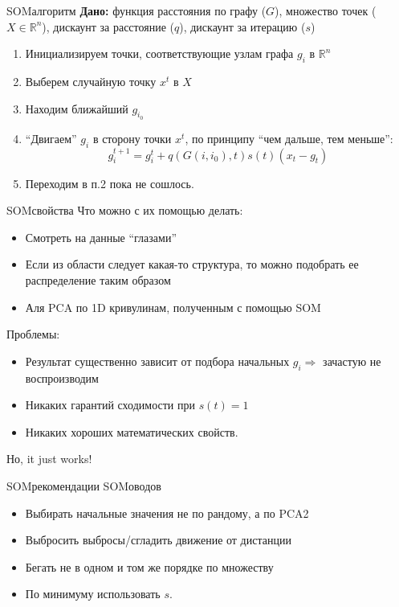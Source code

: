 \documentclass[14pt, fleqn, xcolor={dvipsnames, table}]{beamer}
\begin{document}
\begin{frame}{SOM}{алгоритм}
\textbf{Дано:} функция расстояния по графу ($G$), множество точек ($X \in \mathbb{R}^n$), дискаунт за расстояние ($q$), дискаунт за итерацию ($s$) 
\begin{enumerate}
  \item Инициализируем точки, соответствующие узлам графа $g_i$ в $\mathbb{R}^n$
  \item Выберем случайную точку $x^t$ в $X$
  \item Находим ближайший $g_{i_0}$
  \item ``Двигаем'' $g_i$ в сторону точки $x^t$, по принципу ``чем дальше, тем меньше'':
  $$
    g_i^{t+1} = g_i^t + q(G(i, i_0), t)s(t)(x_t - g_t)
  $$
  \item Переходим в п.2 пока не сошлось.
\end{enumerate}
\end{frame}

\begin{frame}{SOM}{свойства}
Что можно с их помощью делать:
\begin{itemize}
  \item Смотреть на данные ``глазами''
  \item Если из области следует какая-то структура, то можно подобрать ее распределение таким образом
  \item Аля PCA по 1D кривулинам, полученным с помощью SOM
\end{itemize}
Проблемы:
\begin{itemize}
  \item Результат существенно зависит от подбора начальных $g_i \Rightarrow$ зачастую не воспроизводим
  \item Никаких гарантий сходимости при $s(t) = 1$
  \item Никаких хороших математических свойств.
\end{itemize}
Но, it just works!
\end{frame}

\begin{frame}{SOM}{рекомендации SOMоводов}
\begin{itemize}
  \item Выбирать начальные значения не по рандому, а по PCA2
  \item Выбросить выбросы/сгладить движение от дистанции
  \item Бегать не в одном и том же порядке по множеству
  \item По минимуму использовать $s$.
\end{itemize}
\end{frame}
\end{document}
